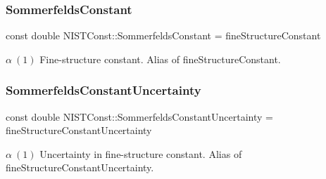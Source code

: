 \subsubsection{\texorpdfstring{Sommerfelds\+Constant}{SommerfeldsConstant}}
{\footnotesize\ttfamily const double N\+I\+S\+T\+Const\+::\+Sommerfelds\+Constant = fine\+Structure\+Constant}

$\alpha \ (1)$ Fine-\/structure constant. Alias of fine\+Structure\+Constant. \mbox{\label{group___fine_structure_constant_ga4ad54e49e7d0bde74be46b2e97c25dfd}} 
\subsubsection{\texorpdfstring{Sommerfelds\+Constant\+Uncertainty}{SommerfeldsConstantUncertainty}}
{\footnotesize\ttfamily const double N\+I\+S\+T\+Const\+::\+Sommerfelds\+Constant\+Uncertainty = fine\+Structure\+Constant\+Uncertainty}

$\alpha \ (1)$ Uncertainty in fine-\/structure constant. Alias of fine\+Structure\+Constant\+Uncertainty. 